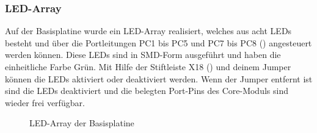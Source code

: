 \subsubsection{LED-Array}
Auf der \gls{Basisplatine} wurde ein LED-Array realisiert, welches aus acht LEDs besteht und über die Portleitungen PC1 bis PC5 und PC7 bis PC8 () angesteuert werden können. Diese LEDs sind in SMD-Form ausgeführt und haben die einheitliche Farbe Grün. Mit Hilfe der Stiftleiste X18 () und deinem Jumper können die LEDs aktiviert oder deaktiviert werden. Wenn der Jumper entfernt ist sind die LEDs deaktiviert und die belegten Port-Pins des \gls{Core-Modul}s sind wieder frei verfügbar.

\begin{figure}[H]
    \centering
    \qquad
    \qquad
    \caption[LED-Array der Basisplatine]{LED-Array der \gls{Basisplatine}}
    \label{fig:basisplatine-leds}
\end{figure}

